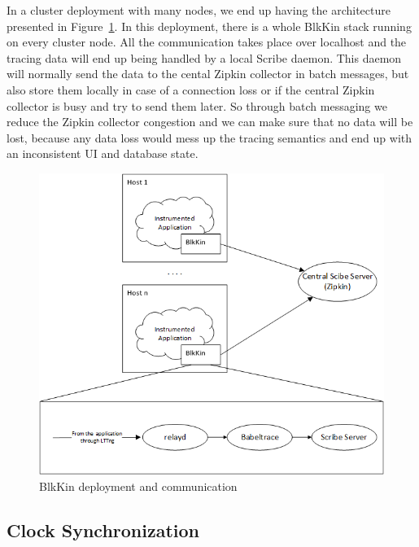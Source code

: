 \documentclass[a4paper,10pt,twocolumn]{article}
\begin{document}
In a cluster deployment with many nodes, we end up having the architecture
presented in Figure~\ref{fig:blkin}. In this deployment, there is a whole
BlkKin stack running on every cluster node. All the communication takes place
over localhost and the tracing data will end up being handled by a local Scribe
daemon. This daemon will normally send the data to the cental Zipkin collector
in batch messages, but also store them locally in case of a connection loss or
if the central Zipkin collector is busy and try to send them later. So through
batch messaging we reduce the Zipkin collector congestion and we can make sure
that no data will be lost, because any data loss would mess up the tracing
semantics and end up with an inconsistent UI and database state.

\begin{figure}[h!]
  \centering
  \includegraphics[scale=0.5]{images/blkin2.png}
  \caption{BlkKin deployment and communication}
  \label{fig:blkin}
\end{figure}

\subsection{Clock Synchronization}
\end{document}
